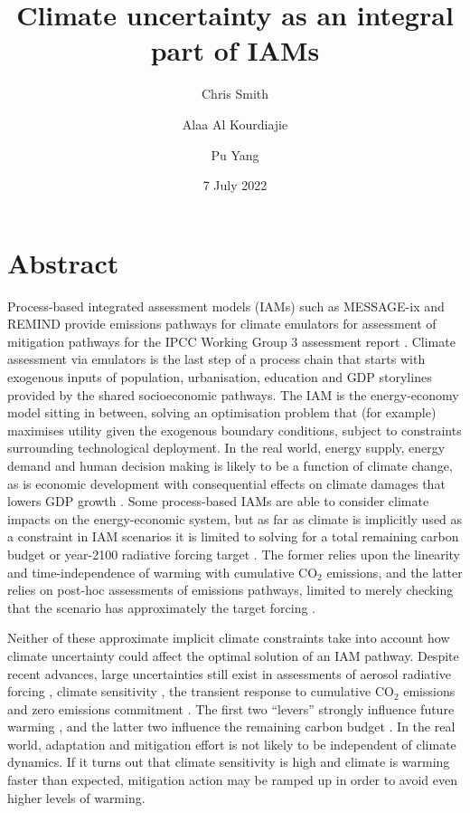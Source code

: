 \documentclass{article}
\title{Climate uncertainty as an integral part of IAMs}
\author[1,2]{Chris Smith}
\author[2,3]{Alaa Al Kourdiajie}
\author[4]{Pu Yang}
\affil[1]{University of Leeds, UK}
\affil[2]{International Institute for Applied Systems Analysis, Austria}
\affil[3]{Imperial College London, UK}
\affil[4]{University College London, UK}
\date{7 July 2022}
\begin{document}
\maketitle

\section*{Abstract}

Process-based integrated assessment models (IAMs) such as MESSAGE-ix and REMIND provide emissions pathways for climate emulators for assessment of mitigation pathways for the IPCC Working Group 3 assessment report \citep{Kikstra2022,Riahi2022}. Climate assessment via emulators is the last step of a process chain that starts with exogenous inputs of population, urbanisation, education and GDP storylines provided by the shared socioeconomic pathways. The IAM is the energy-economy model sitting in between, solving an optimisation problem that (for example) maximises utility given the exogenous boundary conditions, subject to constraints surrounding technological deployment. In the real world, energy supply, energy demand and human decision making is likely to be a function of climate change, as is economic development with consequential effects on climate damages that lowers GDP growth \citep{Rising2022}. Some process-based IAMs are able to consider climate impacts on the energy-economic system, but as far as climate is implicitly used as a constraint in IAM scenarios it is limited to solving for a total remaining carbon budget \citep{Riahi2022} or year-2100 radiative forcing target \citep{ONeill2016}. The former relies upon the linearity and time-independence of warming with cumulative CO$_2$ emissions, and the latter relies on post-hoc assessments of emissions pathways, limited to merely checking that the scenario has approximately the target forcing \citep{Gidden2019}. 

Neither of these approximate implicit climate constraints take into account how climate uncertainty could affect the optimal solution of an IAM pathway. Despite recent advances, large uncertainties still exist in assessments of aerosol radiative forcing \citep{Bellouin2020}, climate sensitivity \citep{Sherwood2020}, the transient response to cumulative CO$_2$ emissions \citep{Canadell2021} and zero emissions commitment \citep{Lee2021}. The first two ``levers'' strongly influence future warming \citep{Smith2019}, and the latter two influence the remaining carbon budget \citep{Rogelj2019}. In the real world, adaptation and mitigation effort is not likely to be independent of climate dynamics. If it turns out that climate sensitivity is high and climate is warming faster than expected, mitigation action may be ramped up in order to avoid even higher levels of warming.
\end{document}
